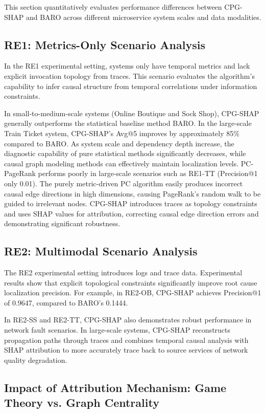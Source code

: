 \documentclass[conference]{IEEEtran}
\begin{document}
This section quantitatively evaluates performance differences between CPG-SHAP and BARO across different microservice system scales and data modalities.

\subsection{RE1: Metrics-Only Scenario Analysis}

In the RE1 experimental setting, systems only have temporal metrics and lack explicit invocation topology from traces. This scenario evaluates the algorithm's capability to infer causal structure from temporal correlations under information constraints.

In small-to-medium-scale systems (Online Boutique and Sock Shop), CPG-SHAP generally outperforms the statistical baseline method BARO. In the large-scale Train Ticket system, CPG-SHAP's Avg@5 improves by approximately 85\% compared to BARO. As system scale and dependency depth increase, the diagnostic capability of pure statistical methods significantly decreases, while causal graph modeling methods can effectively maintain localization levels. PC-PageRank performs poorly in large-scale scenarios such as RE1-TT (Precision@1 only 0.01). The purely metric-driven PC algorithm easily produces incorrect causal edge directions in high dimensions, causing PageRank's random walk to be guided to irrelevant nodes. CPG-SHAP introduces traces as topology constraints and uses SHAP values for attribution, correcting causal edge direction errors and demonstrating significant robustness.

\subsection{RE2: Multimodal Scenario Analysis}

The RE2 experimental setting introduces logs and trace data. Experimental results show that explicit topological constraints significantly improve root cause localization precision. For example, in RE2-OB, CPG-SHAP achieves Precision@1 of 0.9647, compared to BARO's 0.1444.

In RE2-SS and RE2-TT, CPG-SHAP also demonstrates robust performance in network fault scenarios. In large-scale systems, CPG-SHAP reconstructs propagation paths through traces and combines temporal causal analysis with SHAP attribution to more accurately trace back to source services of network quality degradation.

\subsection{Impact of Attribution Mechanism: Game Theory vs. Graph Centrality}
\end{document}
